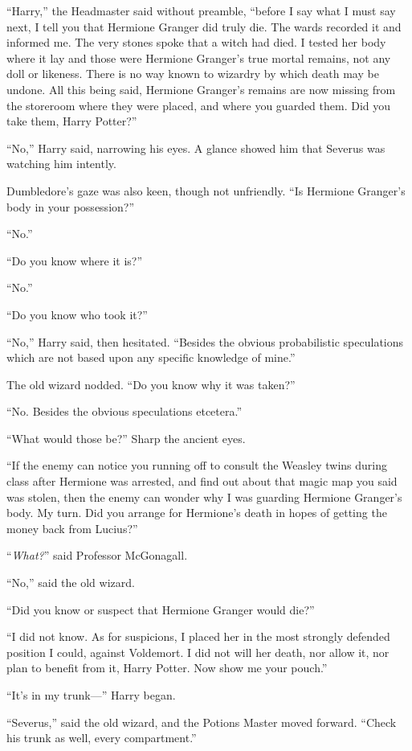 “Harry,” the Headmaster said without preamble, “before I say what I must say next, I tell you that Hermione Granger did truly die. The wards recorded it and informed me. The very stones spoke that a witch had died. I tested her body where it lay and those were Hermione Granger’s true mortal remains, not any doll or likeness. There is no way known to wizardry by which death may be undone. All this being said, Hermione Granger’s remains are now missing from the storeroom where they were placed, and where you guarded them. Did you take them, Harry Potter?”

“No,” Harry said, narrowing his eyes. A glance showed him that Severus was watching him intently.

Dumbledore’s gaze was also keen, though not unfriendly. “Is Hermione Granger’s body in your possession?”

“No.”

“Do you know where it is?”

“No.”

“Do you know who took it?”

“No,” Harry said, then hesitated. “Besides the obvious probabilistic speculations which are not based upon any specific knowledge of mine.”

The old wizard nodded. “Do you know why it was taken?”

“No. Besides the obvious speculations etcetera.”

“What would those be?” Sharp the ancient eyes.

“If the enemy can notice you running off to consult the Weasley twins during class after Hermione was arrested, and find out about that magic map you said was stolen, then the enemy can wonder why I was guarding Hermione Granger’s body. My turn. Did you arrange for Hermione’s death in hopes of getting the money back from Lucius?”

“\emph{What?}” said Professor McGonagall.

“No,” said the old wizard.

“Did you know or suspect that Hermione Granger would die?”

“I did not know. As for suspicions, I placed her in the most strongly defended position I could, against Voldemort. I did not will her death, nor allow it, nor plan to benefit from it, Harry Potter. Now show me your pouch.”

“It’s in my trunk—” Harry began.

“Severus,” said the old wizard, and the Potions Master moved forward. “Check his trunk as well, every compartment.”

